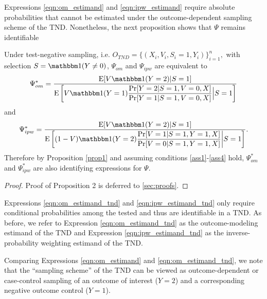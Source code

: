 \documentclass[11pt]{article}
\begin{document}
Expressions \ref{eqn:om_estimand} and \ref{eqn:ipw_estimand} require absolute probabilities that cannot be estimated under the outcome-dependent sampling scheme of the TND. Nonetheless, the next proposition shows that $\Psi$ remains identifiable 
 \begin{proposition}\label{prop2}
      Under test-negative sampling, i.e. $O_{TND} = \{(X_i, V_i, S_i=1, Y_i)\}_{i=1}^n,$ with selection $S = \mathbbm 1(Y\neq 0)$, $\Psi_{om}$ and $\Psi_{ipw}$ are equivalent to 
    \begin{equation}\label{eqn:om_estimand_tnd}
        \Psi_{om}^* = \dfrac{\E[V \mathbbm 1 (Y = 2)|S =1]}{\E\left[V\mathbbm 1 (Y = 1) \dfrac{\Pr[Y = 2 | S = 1, V = 0, X]}{\Pr[Y = 1| S = 1, V = 0, X]}\Big| S = 1 \right]}
    \end{equation}
    and 
     \begin{equation}\label{eqn:ipw_estimand_tnd}
        \Psi_{ipw}^* = \dfrac{\E[V \mathbbm 1 (Y = 2)|S =1]}{\E\left[ (1 - V) \mathbbm 1 (Y = 2) \dfrac{\Pr[V=1 | S=1, Y=1, X]}{\Pr[V=0 | S=1, Y=1, X]} \bigg| S = 1\right]}.
    \end{equation}
    Therefore by Proposition \ref{prop1} and assuming conditions \ref{ass1}-\ref{ass4} hold, $\Psi_{om}^*$ and $\Psi_{ipw}^*$ are also identifying expressions for $\Psi$.
 \end{proposition}
 \begin{proof}
    Proof of Proposition 2 is deferred to \ref{sec:proofs}.
 \end{proof}
    
 Expressions \ref{eqn:om_estimand_tnd} and \ref{eqn:ipw_estimand_tnd} only require conditional probabilities among the tested and thus are identifiable in a TND. As before, we refer to Expression \ref{eqn:om_estimand_tnd} as the outcome-modeling estimand of the TND and Expression \ref{eqn:ipw_estimand_tnd} as the inverse-probability weighting estimand of the TND.

 \begin{remark}
     Comparing Expressions \ref{eqn:om_estimand} and \ref{eqn:om_estimand_tnd}, we note that the ``sampling scheme'' of the TND can be viewed as outcome-dependent or case-control sampling of an outcome of interest ($Y=2$) and a corresponding negative outcome control ($Y=1$). 
 \end{remark}
\end{document}

